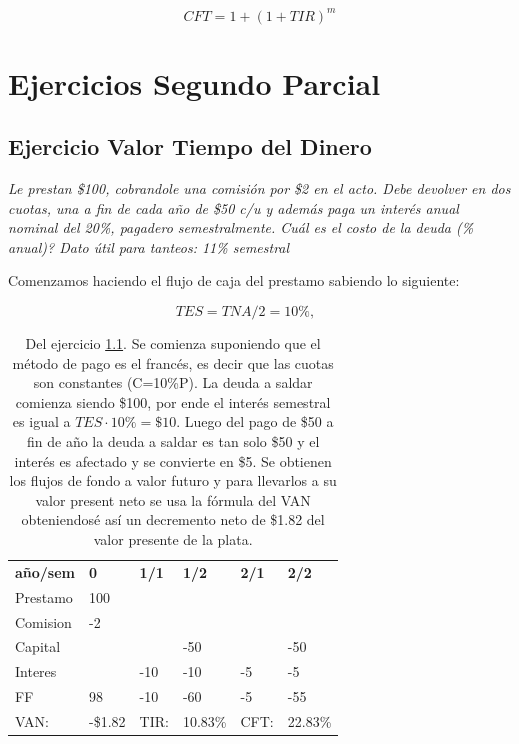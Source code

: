\documentclass[twocolumn,10pt]{article}
\begin{document}
\[
	CFT =  1 + (1+TIR)^{m}
\]


\section{Ejercicios Segundo Parcial}
\subsection{Ejercicio Valor Tiempo del Dinero} \label{ej:VTDprestamo}
\textit{Le prestan \$100, cobrandole una comisión por \$2 en el acto. Debe devolver en dos cuotas, una a fin de cada año de \$50 c/u y además paga un interés anual nominal del 20\%, pagadero semestralmente. Cuál es el costo de la deuda (\% anual)? Dato útil para tanteos: 11\% semestral}

Comenzamos haciendo el flujo de caja del prestamo sabiendo lo siguiente:

\[
	TES = TNA/2= 10\% , \qquad 
\]

\begin{table}[htb!]	
	\caption{Del ejercicio \ref{ej:VTDprestamo}.
		Se comienza suponiendo que el método de pago es el francés, es decir que las cuotas son constantes (C=10\%P).
		La deuda a saldar comienza siendo \$100, por ende el interés semestral es igual a $TES\cdot10\%=\$10$. Luego del pago de \$50 a fin de año la deuda a saldar es tan solo \$50 y el interés es afectado y se convierte en \$5. Se obtienen los flujos de fondo a valor futuro y para llevarlos a su valor present neto se usa la fórmula del VAN obteniendosé así un decremento neto de \$1.82 del valor presente de la plata. }
	\begin{tabular}{l|lllll}
	\textbf{año/sem} & \textbf{0} & \textbf{1/1} & \textbf{1/2} & \textbf{2/1} & \textbf{2/2} \\
	Prestamo       & 100        &              &              &     &     \\
	Comision         & -2         &              &              &     &     \\
	Capital          &            &              & -50          &     & -50 \\
	Interes          &            & -10          & -10          & -5  & -5  \\\hline
	FF               & 98         & -10          & -60          & -5  & -55 \\ \hline
	VAN:              &  -\$1.82  &    TIR:           &      10.83\%        &   CFT:  & 22.83\%   
	\end{tabular}	
\end{table}
\end{document}
